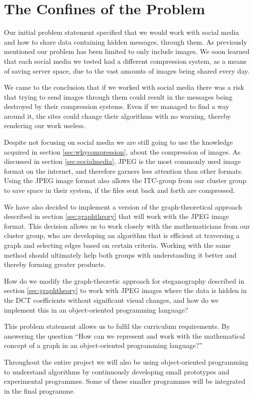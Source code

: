 \section{The Confines of the Problem}
\label{sec:confines}
Our initial problem statement specified that we would work with social media and how to share data containing hidden messages, through them.
As previously mentioned our problem has been limited to only include images.
We soon learned that each social media we tested had a different compression system, as a means of saving server space, due to the vast amounts of images being shared every day.

We came to the conclusion that if we worked with social media there was a risk that trying to send images through them could result in the messages being destroyed by their compression systems.
Even if we managed to find a way around it, the sites could change their algorithms with no warning, thereby rendering our work useless.

Despite not focusing on social media we are still going to use the knowledge acquired in section \ref{sec:whycompression}, about the compression of images.
As discussed in section \ref{sec:socialmedia}, JPEG is the most commonly used image format on the internet, and therefore garners less attention than other formats.
Using the JPEG image format also allows the ITC-group from our cluster group to save space in their system, if the files sent back and forth are compressed.

We have also decided to implement a version of the graph-theoretical approach described in section \ref{sec:graphtheory} that will work with the JPEG image format.
This decision allows us to work closely with the mathematicians from our cluster group, who are developing an algorithm that is efficient at traversing a graph and selecting edges based on certain criteria.
Working with the same method should ultimately help both groups with understanding it better and thereby forming greater products.

\vspace{5mm}
\begin{centering}
	\begin{tcolorbox}[center title, title=Problem Statement, width=.8\textwidth]
How do we modify the graph-theoretic approach for steganography described in section \ref{sec:graphtheory} to work with JPEG images where the data is hidden in the DCT coefficients without significant visual changes, and how do we implement this in an object-oriented programming language?
	\end{tcolorbox}
\end{centering}

This problem statement allows us to fulfil the curriculum requirements.
By answering the question
``How can we represent and work with the mathematical concept of a graph in an object-oriented programming language?''


Throughout the entire project we will also be using object-oriented programming to understand algorithms by continuously developing small prototypes and experimental programmes.
Some of these smaller programmes will be integrated in the final programme.
